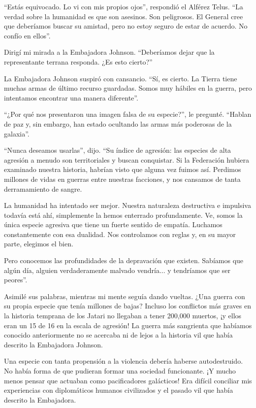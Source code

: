 \documentclass[spanish,12pt,a4paper,oneside,titlepage]{book}
\begin{document}
    ``Estás equivocado. Lo vi con mis propios ojos'', respondió el Alférez Telus. ``La verdad sobre la humanidad es que son asesinos. Son peligrosos. El General cree que deberíamos buscar su amistad, pero no estoy seguro de estar de acuerdo. No confío en ellos''.

    Dirigí mi mirada a la Embajadora Johnson. ``Deberíamos dejar que la representante terrana responda. ¿Es esto cierto?''

    La Embajadora Johnson suspiró con cansancio. ``Sí, es cierto. La Tierra tiene muchas armas de último recurso guardadas. Somos muy hábiles en la guerra, pero intentamos encontrar una manera diferente''.

    ``¿Por qué nos presentaron una imagen falsa de su especie?'', le pregunté. ``Hablan de paz y, sin embargo, han estado ocultando las armas más poderosas de la galaxia''.

    ``Nunca deseamos usarlas'', dijo. ``Su índice de agresión: las especies de alta agresión a menudo son territoriales y buscan conquistar. Si la Federación hubiera examinado nuestra historia, habrían visto que alguna vez fuimos así. Perdimos millones de vidas en guerras entre nuestras facciones, y nos cansamos de tanta derramamiento de sangre.

    La humanidad ha intentado ser mejor. Nuestra naturaleza destructiva e impulsiva todavía está ahí, simplemente la hemos enterrado profundamente. Ve, somos la única especie agresiva que tiene un fuerte sentido de empatía. Luchamos constantemente con esa dualidad. Nos controlamos con reglas y, en su mayor parte, elegimos el bien.

    Pero conocemos las profundidades de la depravación que existen. Sabíamos que algún día, alguien verdaderamente malvado vendría... y tendríamos que ser peores''.

    Asimilé sus palabras, mientras mi mente seguía dando vueltas. ¿Una guerra con su propia especie que tenía millones de bajas? Incluso los conflictos más graves en la historia temprana de los Jatari no llegaban a tener 200,000 muertos, ¡y ellos eran un 15 de 16 en la escala de agresión! La guerra más sangrienta que habíamos conocido anteriormente no se acercaba ni de lejos a la historia vil que había descrito la Embajadora Johnson.

    Una especie con tanta propensión a la violencia debería haberse autodestruido. No había forma de que pudieran formar una sociedad funcionante. ¡Y mucho menos pensar que actuaban como pacificadores galácticos! Era difícil conciliar mis experiencias con diplomáticos humanos civilizados y el pasado vil que había descrito la Embajadora.
\end{document}
